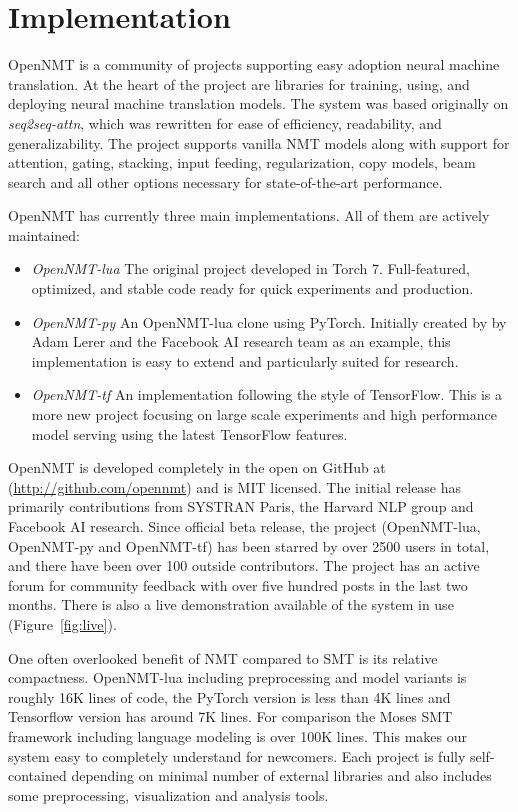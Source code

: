 \documentclass[]{article}
\begin{document}
\section{Implementation}

OpenNMT is a community of projects supporting easy adoption neural
machine translation. At the heart of the project are libraries for
training, using, and deploying neural machine translation models. The
system was based originally on \textit{seq2seq-attn}, which was rewritten for ease of efficiency, readability, and
generalizability. The project supports vanilla NMT models along with
support for attention, gating, stacking, input feeding,
regularization, copy models, beam search and all other options
necessary for state-of-the-art performance.

OpenNMT has currently three main implementations. All of them are actively maintained:

\begin{itemize}
\item \textit{OpenNMT-lua} The original project developed in Torch 7.
  Full-featured, optimized, and stable code ready for quick
  experiments and production.
  \item \textit{OpenNMT-py} An OpenNMT-lua clone using PyTorch.
    Initially created by by Adam Lerer and the Facebook AI research
    team as an example, this implementation is easy to extend and
    particularly suited for research.
  \item \textit{OpenNMT-tf} An implementation following the style of
    TensorFlow.  This is a more new project focusing on large scale
    experiments and high performance model serving using the latest
    TensorFlow features.
\end{itemize}

OpenNMT is developed completely in the open on GitHub at
(\url{http://github.com/opennmt}) and is MIT licensed.  The initial
release has primarily contributions from SYSTRAN Paris, the Harvard
NLP group and Facebook AI research. Since official beta release, the
project (OpenNMT-lua, OpenNMT-py and OpenNMT-tf) has been starred by
over 2500 users in total, and there have been over 100 outside
contributors. The project has an active forum for community feedback
with over five hundred posts in the last two months. There is also a
live demonstration available of the system in use
(Figure~\ref{fig:live}).


One often overlooked benefit of  NMT compared to SMT is its relative compactness.
OpenNMT-lua including preprocessing and model variants is roughly 16K lines of code,
the PyTorch version is less than 4K lines and Tensorflow version has around 7K lines. For comparison the Moses SMT framework
including language modeling is over 100K lines. This makes our system
easy to completely understand for newcomers. Each project is fully
self-contained depending on minimal number of external libraries
and also includes some preprocessing, visualization and analysis tools.
\end{document}
